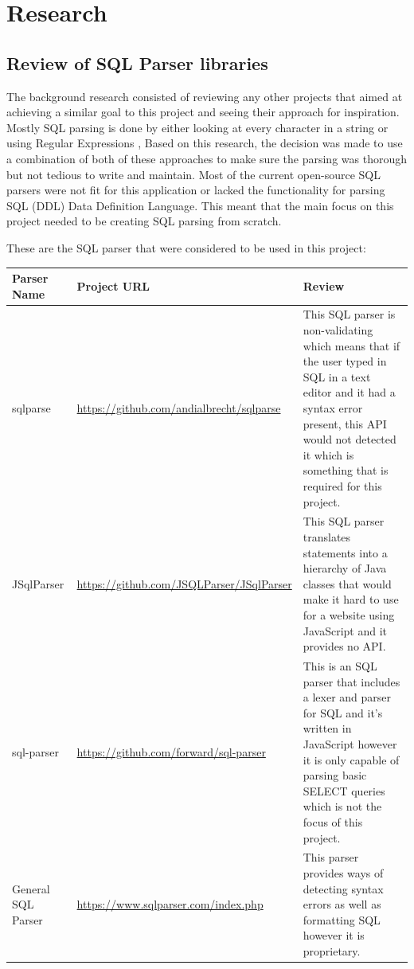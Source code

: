 \section{Research}

\subsection{Review of SQL Parser libraries}

The background research consisted of reviewing any other projects that aimed at achieving a similar goal to this project and seeing their approach for inspiration. Mostly SQL parsing is done by either looking at every character in a string or using Regular Expressions \cite{Regex}, Based on this research, the decision was made to use a combination of both of these approaches to make sure the parsing was thorough but not tedious to write and maintain. Most of the current open-source SQL parsers were not fit for this application or lacked the functionality for parsing SQL (DDL) Data Definition Language. This meant that the main focus on this project needed to be creating SQL parsing from scratch.

These are the SQL parser that were considered to be used in this project:

\begin{center}
	\setlength\extrarowheight{2pt}
	\begin{tabularx}{\textwidth}{|X|X|X|}
		\hline
		\textbf{Parser Name} & \textbf{Project URL} & \textbf{Review} \\
		\hline
		sqlparse & \url{https://github.com/andialbrecht/sqlparse} &  This SQL parser is non-validating which means that if the user typed in SQL in a text editor and it had a syntax error present, this API would not detected it which is something that is required for this project.\\
		\hline
		JSqlParser & \url{https://github.com/JSQLParser/JSqlParser} &  This SQL parser translates statements into a hierarchy of Java classes that would make it hard to use for a website using JavaScript and it provides no API.\\
		\hline
		sql-parser & \url{https://github.com/forward/sql-parser} & This is an SQL parser that includes a lexer and parser for SQL and it's written in JavaScript however it is only capable of parsing basic SELECT queries which is not the focus of this project.\\
		\hline
		General SQL Parser & \url{https://www.sqlparser.com/index.php} & This parser provides ways of detecting syntax errors as well as formatting SQL however it is proprietary.\\
		\hline
	\end{tabularx}
	
\end{center}

